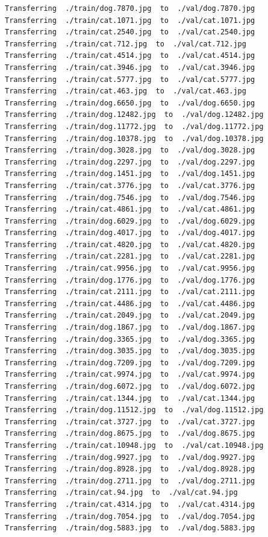 \documentclass[]{book}
\theoremstyle{definition}
\theoremstyle{definition}
\theoremstyle{definition}
\theoremstyle{remark}
\begin{document}
\begin{verbatim}
Transferring  ./train/dog.7870.jpg  to  ./val/dog.7870.jpg
Transferring  ./train/cat.1071.jpg  to  ./val/cat.1071.jpg
Transferring  ./train/cat.2540.jpg  to  ./val/cat.2540.jpg
Transferring  ./train/cat.712.jpg  to  ./val/cat.712.jpg
Transferring  ./train/cat.4514.jpg  to  ./val/cat.4514.jpg
Transferring  ./train/cat.3946.jpg  to  ./val/cat.3946.jpg
Transferring  ./train/cat.5777.jpg  to  ./val/cat.5777.jpg
Transferring  ./train/cat.463.jpg  to  ./val/cat.463.jpg
Transferring  ./train/dog.6650.jpg  to  ./val/dog.6650.jpg
Transferring  ./train/dog.12482.jpg  to  ./val/dog.12482.jpg
Transferring  ./train/dog.11772.jpg  to  ./val/dog.11772.jpg
Transferring  ./train/dog.10378.jpg  to  ./val/dog.10378.jpg
Transferring  ./train/dog.3028.jpg  to  ./val/dog.3028.jpg
Transferring  ./train/dog.2297.jpg  to  ./val/dog.2297.jpg
Transferring  ./train/dog.1451.jpg  to  ./val/dog.1451.jpg
Transferring  ./train/cat.3776.jpg  to  ./val/cat.3776.jpg
Transferring  ./train/dog.7546.jpg  to  ./val/dog.7546.jpg
Transferring  ./train/cat.4861.jpg  to  ./val/cat.4861.jpg
Transferring  ./train/dog.6029.jpg  to  ./val/dog.6029.jpg
Transferring  ./train/dog.4017.jpg  to  ./val/dog.4017.jpg
Transferring  ./train/cat.4820.jpg  to  ./val/cat.4820.jpg
Transferring  ./train/cat.2281.jpg  to  ./val/cat.2281.jpg
Transferring  ./train/cat.9956.jpg  to  ./val/cat.9956.jpg
Transferring  ./train/dog.1776.jpg  to  ./val/dog.1776.jpg
Transferring  ./train/cat.2111.jpg  to  ./val/cat.2111.jpg
Transferring  ./train/cat.4486.jpg  to  ./val/cat.4486.jpg
Transferring  ./train/cat.2049.jpg  to  ./val/cat.2049.jpg
Transferring  ./train/dog.1867.jpg  to  ./val/dog.1867.jpg
Transferring  ./train/dog.3365.jpg  to  ./val/dog.3365.jpg
Transferring  ./train/dog.3035.jpg  to  ./val/dog.3035.jpg
Transferring  ./train/dog.7209.jpg  to  ./val/dog.7209.jpg
Transferring  ./train/cat.9974.jpg  to  ./val/cat.9974.jpg
Transferring  ./train/dog.6072.jpg  to  ./val/dog.6072.jpg
Transferring  ./train/cat.1344.jpg  to  ./val/cat.1344.jpg
Transferring  ./train/dog.11512.jpg  to  ./val/dog.11512.jpg
Transferring  ./train/cat.3727.jpg  to  ./val/cat.3727.jpg
Transferring  ./train/dog.8675.jpg  to  ./val/dog.8675.jpg
Transferring  ./train/cat.10948.jpg  to  ./val/cat.10948.jpg
Transferring  ./train/dog.9927.jpg  to  ./val/dog.9927.jpg
Transferring  ./train/dog.8928.jpg  to  ./val/dog.8928.jpg
Transferring  ./train/dog.2711.jpg  to  ./val/dog.2711.jpg
Transferring  ./train/cat.94.jpg  to  ./val/cat.94.jpg
Transferring  ./train/cat.4314.jpg  to  ./val/cat.4314.jpg
Transferring  ./train/dog.7054.jpg  to  ./val/dog.7054.jpg
Transferring  ./train/dog.5883.jpg  to  ./val/dog.5883.jpg

\end{verbatim}
\end{document}
